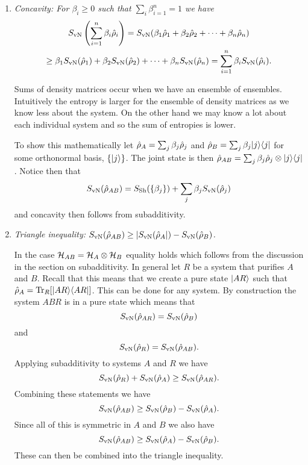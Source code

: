 \begin{enumerate}
        \item \emph{Concavity: For \(\beta_i \ge 0\) such that \(\sum_i \beta_{i=1}^{n} = 1\) we have}
        \begin{multline*}
            S_{\mathrm{vN}}\left( \sum_{i=1}^{n}\beta_i\hat{\rho}_i \right) = S_{\mathrm{vN}}(\beta_1\hat{\rho}_1 + \beta_2\hat{\rho}_2 + \dotsb + \beta_n\hat{\rho}_n) \\\ge \beta_1S_{\mathrm{vN}}(\hat{\rho}_1) + \beta_2S_{\mathrm{vN}}(\hat{\rho}_2) + \dotsb + \beta_nS_{\mathrm{vN}}(\hat{\rho}_n) = \sum_{i=1}^{n}\beta_i S_{\mathrm{vN}}(\hat{\rho}_i).
        \end{multline*}
        
        Sums of density matrices occur when we have an ensemble of ensembles.
        Intuitively the entropy is larger for the ensemble of density matrices as we know less about the system.
        On the other hand we may know a lot about each individual system and so the sum of entropies is lower.
        
        To show this mathematically let \(\hat{\rho}_A = \sum_j\beta_j\hat{\rho}_j\) and \(\hat{\rho}_B = \sum_j\beta_j\vert {j}\rangle\langle {j} \vert\) for some orthonormal basis, \(\{\vert {j} \rangle\}\).
        The joint state is then \(\hat{\rho}_{AB} = \sum_j\beta_j\hat{\rho}_j\otimes\vert {j}\rangle\langle {j} \vert\).
        Notice then that
        \[S_{\mathrm{vN}}(\hat{\rho}_{AB}) = S_{\mathrm{Sh}}(\{\beta_j\}) + \sum_j \beta_j S_{\mathrm{vN}}(\hat{\rho}_j)\]
        and concavity then follows from subadditivity.
        
        \item \emph{Triangle inequality: \(S_{\mathrm{vN}}(\hat{\rho}_{AB}) \ge \abs{S_{\mathrm{vN}}(\hat{\rho}_A}) - S_{\mathrm{vN}}(\hat{\rho}_B)\).}
        
        In the case \(\mathcal{H}_{AB} = \mathcal{H}_A\otimes\mathcal{H}_B\) equality holds which follows from the discussion in the section on subadditivity.
        In general let \(R\) be a system that purifies \(A\) and \(B\).
        Recall that this means that we create a pure state \(\vert {AR} \rangle\) such that \(\hat{\rho}_A = \Tr_R[\vert {AR}\rangle\langle {AR} \vert]\).
        This can be done for any system.
        By construction the system \(ABR\) is in a pure state which means that
        \[S_{\mathrm{vN}}(\hat{\rho}_{AR}) = S_{\mathrm{vN}}(\hat{\rho}_B)\]
        and
        \[S_{\mathrm{vN}}(\hat{\rho}_R) = S_{\mathrm{vN}}(\hat{\rho}_{AB}).\]
        Applying subadditivity to systems \(A\) and \(R\) we have
        \[S_{\mathrm{vN}}(\hat{\rho}_R) + S_{\mathrm{vN}}(\hat{\rho}_A) \ge S_{\mathrm{vN}}(\hat{\rho}_{AR}).\]
        Combining these statements we have
        \[S_{\mathrm{vN}}(\hat{\rho}_{AB}) \ge S_{\mathrm{vN}}(\hat{\rho}_B) - S_{\mathrm{vN}}(\hat{\rho}_A).\]
        Since all of this is symmetric in \(A\) and \(B\) we also have
        \[S_{\mathrm{vN}}(\hat{\rho}_{AB}) \ge S_{\mathrm{vN}}(\hat{\rho}_A) - S_{\mathrm{vN}}(\hat{\rho}_B).\]
        These can then be combined into the triangle inequality.
        

\end{enumerate}
